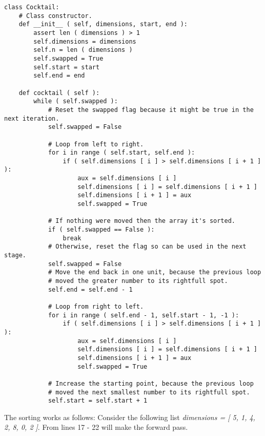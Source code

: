 \begin{lstlisting}
class Cocktail:
    # Class constructor.
    def __init__ ( self, dimensions, start, end ):
        assert len ( dimensions ) > 1
        self.dimensions = dimensions
        self.n = len ( dimensions )
        self.swapped = True
        self.start = start
        self.end = end

    def cocktail ( self ):
        while ( self.swapped ):
            # Reset the swapped flag because it might be true in the next iteration.
            self.swapped = False

            # Loop from left to right.
            for i in range ( self.start, self.end ):
                if ( self.dimensions [ i ] > self.dimensions [ i + 1 ] ):
                    aux = self.dimensions [ i ]
                    self.dimensions [ i ] = self.dimensions [ i + 1 ]
                    self.dimensions [ i + 1 ] = aux
                    self.swapped = True
                    
            # If nothing were moved then the array it's sorted.
            if ( self.swapped == False ):
                break
            # Otherwise, reset the flag so can be used in the next stage.
            self.swapped = False
            # Move the end back in one unit, because the previous loop
            # moved the greater number to its rightfull spot.
            self.end = self.end - 1

            # Loop from right to left.
            for i in range ( self.end - 1, self.start - 1, -1 ):
                if ( self.dimensions [ i ] > self.dimensions [ i + 1 ] ):
                    aux = self.dimensions [ i ]
                    self.dimensions [ i ] = self.dimensions [ i + 1 ]
                    self.dimensions [ i + 1 ] = aux
                    self.swapped = True

            # Increase the starting point, because the previous loop
            # moved the next smallest number to its rightfull spot.
            self.start = self.start + 1
\end{lstlisting} \hfill \break

The sorting works as follows: Consider the following list {\itshape dimensions = [ 5, 1, 4, 2, 8, 0, 2 ]}. From lines 17 - 22 will make the forward pass. \hfill \break

